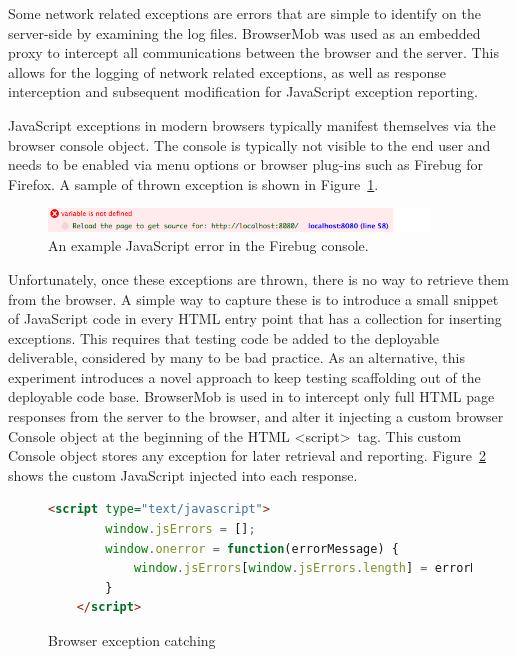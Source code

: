 Some network related exceptions are errors that are simple to identify on the server-side by examining the log files.  BrowserMob was used as an embedded proxy to intercept all communications between the browser and the server.  This allows for the logging of network related exceptions, as well as response interception and subsequent modification for JavaScript exception reporting.

JavaScript exceptions in modern browsers typically manifest themselves via the browser console object.  The console is typically not visible to the end user and needs to be enabled via menu options or browser plug-ins such as Firebug for Firefox.  A sample of thrown exception is shown in Figure~\ref{fig:consoleError}.

\begin{figure}[H]
\includegraphics[width=0.9\textwidth]{images/console-error.png}
\caption{An example JavaScript error in the Firebug console.}
\label{fig:consoleError}
\end{figure}

Unfortunately, once these exceptions are thrown, there is no way to retrieve them from the browser.  A simple way to capture these is to introduce a small snippet of JavaScript code in every HTML entry point that has a collection for inserting exceptions.  This requires that testing code be added to the deployable deliverable, considered by many to be bad practice.  As an alternative, this experiment introduces a novel approach to keep testing scaffolding out of the deployable code base.  BrowserMob is used in to intercept only full HTML page responses from the server to the browser, and alter it injecting a custom browser Console object at the beginning of the HTML \textless script\textgreater\  tag.  This custom Console object stores any exception for later retrieval and reporting.  Figure~\ref{consoleJavascript} shows the custom JavaScript injected into each response.

\begin{figure}
\begin{lstlisting}[language=HTML]
	<script type="text/javascript">
		window.jsErrors = [];
		window.onerror = function(errorMessage) {
			window.jsErrors[window.jsErrors.length] = errorMessage;
		}
	</script>
\end{lstlisting}
\caption{Browser exception catching}
\label{consoleJavascript}
\end{figure}

